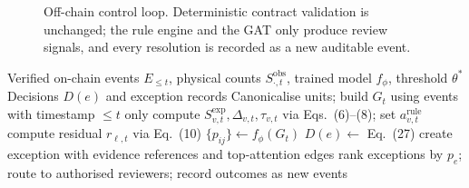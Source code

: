 \documentclass[conference,a4paper]{IEEEtran}
\begin{document}
\begin{figure}[!t]
\centering
{}
\caption{Off-chain control loop. Deterministic contract validation is unchanged; the rule engine and the GAT only produce review signals, and every resolution is recorded as a new auditable event.}
\label{fig:loop}
\end{figure}

\begin{algorithm}[!t]
\caption{Reconciliation and GAT-Assisted Review (period $t$)}
\label{alg:main}
\begin{algorithmic}[1]
\REQUIRE Verified on-chain events $E_{\le t}$, physical counts $S^{\mathrm{obs}}_{\cdot,t}$, trained model $f_\phi$, threshold $\theta^*$
\ENSURE Decisions $D(e)$ and exception records
\STATE Canonicalise units; build $G_t$ using events with timestamp $\le t$ only
  \STATE compute $S^{\mathrm{exp}}_{v,t},\Delta_{v,t},\tau_{v,t}$ via Eqs.~(6)--(8); set $a^{\mathrm{rule}}_{v,t}$
\ENDFOR
{}
  \STATE compute residual $r_{\ell,t}$ via Eq.~(10)
\ENDFOR
\STATE $\{p_{ij}\}\leftarrow f_\phi(G_t)$ 
  \STATE $D(e)\leftarrow$ Eq.~(27)
    \STATE create exception with evidence references and top-attention edges
  \ENDIF
\ENDFOR
\STATE rank exceptions by $p_e$; route to authorised reviewers; record outcomes as new events
\end{algorithmic}
\end{algorithm}
\end{document}
